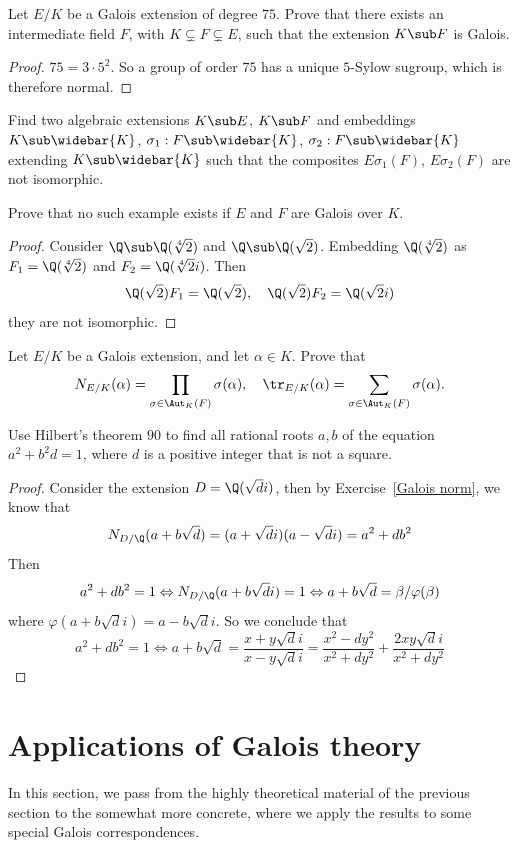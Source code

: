 \begin{exercise}
Let $E/K$ be a Galois extension of degree $75$. Prove that there exists an intermediate field $F$, with $K\subsetneq F\subsetneq E$, such that the extension $K\sub F$ is Galois.
\end{exercise}
\begin{proof}
$75=3\cdot 5^2$. So a group of order $75$ has a unique $5$-Sylow sugroup, which is therefore normal.
\end{proof}
\begin{exercise}
Find two algebraic extensions $K\sub E$, $K\sub F$ and embeddings $K\sub \widebar{K}$, $\sigma_1:F\sub\widebar{K}$, $\sigma_2:F\sub\widebar{K}$ extending $K\sub\widebar{K}$ such that the composites $E\sigma_1(F)$, $E\sigma_2(F)$ are not isomorphic.\par
Prove that no such example exists if $E$ and $F$ are Galois over $K$.
\end{exercise}
\begin{proof}
Consider $\Q\sub\Q(\sqrt[4]{2})$ and $\Q\sub\Q(\sqrt{2})$. Embedding $\Q(\sqrt[4]{2})$ as $F_1=\Q(\sqrt[4]{2})$ and $F_2=\Q(\sqrt[4]{2}i)$. Then
\[\Q(\sqrt{2})F_1=\Q(\sqrt{2}),\quad \Q(\sqrt{2})F_2=\Q(\sqrt{2}i)\]
they are not isomorphic.
\end{proof}
\begin{exercise}\label{Galois norm}
Let $E/K$ be a Galois extension, and let $\alpha\in K$. Prove that
\[N_{E/K}(\alpha)=\prod_{\sigma\in\Aut_K(F)}\sigma(\alpha),\quad \tr_{E/K}(\alpha)=\sum_{\sigma\in\Aut_K(F)}\sigma(\alpha).\]
\end{exercise}
\begin{exercise}
Use Hilbert's theorem $90$ to find all rational roots $a,b$ of the equation $a^2+b^2d=1$, where $d$ is a positive integer that is not a square.
\end{exercise}
\begin{proof}
Consider the extension $D=\Q(\sqrt{d}i)$, then by Exercise~\ref{Galois norm}, we know that
\[N_{D/\Q}(a+b\sqrt{d})=(a+\sqrt{d}i)(a-\sqrt{d}i)=a^2+db^2\]
Then
\[a^2+db^2=1\Leftrightarrow N_{D/\Q}(a+b\sqrt{d}i)=1\Leftrightarrow a+b\sqrt{d}=\beta/\varphi(\beta)\]
where $\varphi(a+b\sqrt{d}i)=a-b\sqrt{d}i$. So we conclude that
\[a^2+db^2=1\Leftrightarrow a+b\sqrt{d}=\dfrac{x+y\sqrt{d}i}{x-y\sqrt{d}i}=\dfrac{x^2-dy^2}{x^2+dy^2}+\dfrac{2xy\sqrt{d}i}{x^2+dy^2}\]
\end{proof}
\section{Applications of Galois theory}
In this section, we pass from the highly theoretical material of the previous section to the somewhat more concrete, where we apply the results to some special Galois correspondences.
